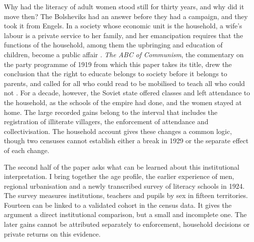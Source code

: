 \documentclass[12pt]{article}
\begin{document}
Why had the literacy of adult women stood still for thirty years, and why did it move then? The Bolsheviks had an answer before they had a campaign, and they took it from Engels. In a society whose economic unit is the household, a wife's labour is a private service to her family, and her emancipation requires that the functions of the household, among them the upbringing and education of children, become a public affair \citep{engels1884}. \emph{The ABC of Communism}, the commentary on the party programme of 1919 from which this paper takes its title, drew the conclusion that the right to educate belongs to society before it belongs to parents, and called for all who could read to be mobilised to teach all who could not \citep{bukharin1919}. For a decade, however, the Soviet state offered classes and left attendance to the household, as the schools of the empire had done, and the women stayed at home. The large recorded gains belong to the interval that includes the registration of illiterate villagers, the enforcement of attendance and collectivisation. The household account gives these changes a common logic, though two censuses cannot establish either a break in 1929 or the separate effect of each change.

The second half of the paper asks what can be learned about this institutional interpretation. I bring together the age profile, the earlier experience of men, regional urbanisation and a newly transcribed survey of literacy schools in 1924. The survey measures institutions, teachers and pupils by sex in fifteen territories. Fourteen can be linked to a validated cohort in the census data. It gives the argument a direct institutional comparison, but a small and incomplete one. The later gains cannot be attributed separately to enforcement, household decisions or private returns on this evidence.
\end{document}
